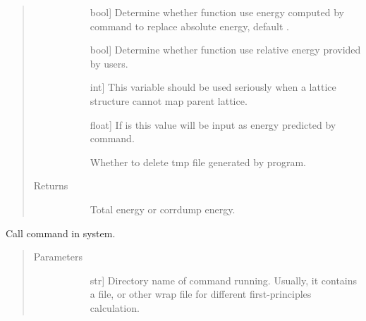 \documentclass[letterpaper,10pt,english]{sphinxmanual}
\begin{document}
\begin{fulllineitems}
\begin{fulllineitems}
\begin{quote}
\begin{description}
\begin{description}
\item[{}] \leavevmode{[}bool{]}
Determine whether function use energy computed by 
command to replace absolute energy, default .

\item[{}] \leavevmode{[}bool{]}
Determine whether function use relative energy provided by users.

\item[{}] \leavevmode{[}int{]}
This variable should be used seriously when a lattice structure
cannot map parent lattice.

\item[{}] \leavevmode{[}float{]}
If  is  this value will be input as energy predicted
by  command.

\item[{}] \leavevmode
Whether to delete tmp file generated by program.

\end{description}

\item[{Returns}] \leavevmode\begin{description}
\item[{}] \leavevmode
Total energy or corrdump energy.

\end{description}

\end{description}\end{quote}

\end{fulllineitems}


\begin{fulllineitems}
\label{\detokenize{pygace:pygace.ce.CE.mmaps}}
Call  command in system.
\begin{quote}\begin{description}
\item[{Parameters}] \leavevmode\begin{description}
\item[{}] \leavevmode{[}str{]}
Directory name of  command running. Usually, it contains a
 file,  or other wrap file for different
first-principles calculation.


\end{description}
\end{description}
\end{quote}
\end{fulllineitems}
\end{fulllineitems}
\end{document}
